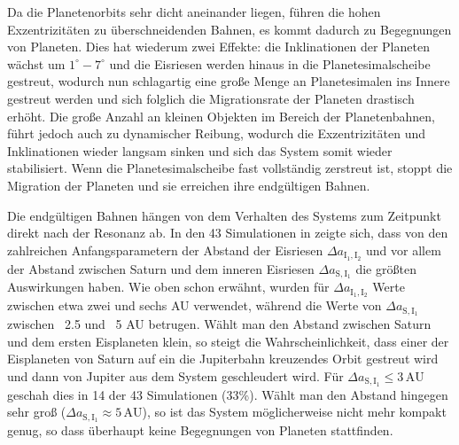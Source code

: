 \documentclass[12pt,a4paper,twoside]{article}
\newcommand{\AU}{\,\mathrm{AU}}
\begin{document}
Da die Planetenorbits sehr dicht aneinander liegen, führen die hohen Exzentrizitäten zu überschneidenden Bahnen\cite{Tsiganis2005}, es kommt dadurch zu Begegnungen von Planeten. %
Dies hat wiederum zwei Effekte: die Inklinationen der Planeten wächst um $1^\circ-7^\circ$ und die Eisriesen werden hinaus in die Planetesimalscheibe gestreut,
wodurch nun schlagartig eine große Menge an Planetesimalen ins Innere gestreut werden und sich folglich die Migrationsrate der Planeten drastisch erhöht\cite{Tsiganis2005}.
Die große Anzahl an kleinen Objekten im Bereich der Planetenbahnen, führt jedoch auch zu dynamischer Reibung, %
wodurch die Exzentrizitäten und Inklinationen wieder langsam sinken und sich das System somit wieder stabilisiert\cite{Tsiganis2005}.
Wenn die Planetesimalscheibe fast vollständig zerstreut ist, stoppt die Migration der Planeten und sie erreichen ihre endgültigen Bahnen\cite{Tsiganis2005}.

\newcommand{\DII}{\Delta a_{\mathrm{I}_1,\mathrm{I}_2}}
\newcommand{\DSI}{\Delta a_{\mathrm{S},\mathrm{I}_1}} %
Die endgültigen Bahnen hängen von dem Verhalten des Systems zum Zeitpunkt direkt nach der Resonanz ab. In den 43 Simulationen in \cite{Tsiganis2005} zeigte sich, dass von den zahlreichen Anfangsparametern der Abstand der Eisriesen $\DII$ und vor allem der Abstand zwischen Saturn und dem inneren Eisriesen $\DSI$ die größten Auswirkungen haben\cite{Tsiganis2005}.
Wie oben schon erwähnt, wurden für $\DII$ Werte zwischen etwa zwei und sechs AU verwendet, während die Werte von $\DSI$ zwischen ~2.5 und ~5 AU betrugen\cite{Tsiganis2005}.
Wählt man den Abstand zwischen Saturn und dem ersten Eisplaneten klein, so steigt die Wahrscheinlichkeit, dass einer der Eisplaneten von Saturn auf ein die Jupiterbahn kreuzendes Orbit gestreut wird und dann von Jupiter aus dem System geschleudert wird. Für $\DSI \le 3 \AU $ geschah dies in 14 der 43 Simulationen (33\%).
Wählt man den Abstand hingegen sehr groß ($\DSI \approx 5 \AU$), so ist das System möglicherweise nicht mehr kompakt genug, so dass überhaupt keine Begegnungen von Planeten stattfinden. %
\end{document}
